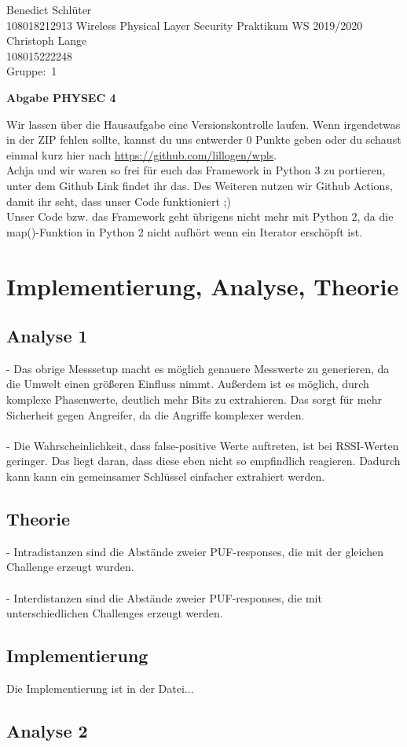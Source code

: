 \documentclass[12pt,a4paper]{article}
\newcommand{\student}{Benedict Schlüter\\ 108018212913 } %
\newcommand{\partner}{Christoph Lange\\ 108015222248} %
\newcommand{\group}{1} %
\newcommand{\hwheadtwo}{$ $
  \vspace{-2cm}
  
\noindent \student \qquad \qquad  Wireless Physical Layer Security Praktikum \hfill WS 2019/2020 \\
\noindent \partner \\
\noindent Gruppe:~\group\\
$ $

  
\begin{center}    
{\Large \bf Abgabe PHYSEC 4}
\end{center}
}
\begin{document}
\hwheadtwo
Wir lassen über die Hausaufgabe eine Versionskontrolle laufen. Wenn irgendetwas in der ZIP fehlen sollte, kannst du uns entwerder 0 Punkte geben oder du schaust einmal kurz hier nach \url{https://github.com/lillogen/wpls}.\\
Achja und wir waren so frei für euch das Framework in Python 3 zu portieren, unter dem Github Link findet ihr das. Des Weiteren nutzen wir Github Actions, damit ihr seht, dass unser Code funktioniert ;)\\
Unser Code bzw. das Framework geht übrigens nicht mehr mit Python 2, da die map()-Funktion in Python 2 nicht aufhört wenn ein Iterator erschöpft ist.
\tableofcontents
\newpage

\section{Implementierung, Analyse, Theorie}
\subsection*{Analyse 1}
- Das obrige Messsetup macht es möglich genauere Messwerte zu generieren, da die Umwelt einen größeren Einfluss nimmt. Außerdem ist es möglich, durch komplexe Phasenwerte, deutlich mehr Bits zu extrahieren. Das sorgt für mehr Sicherheit gegen Angreifer, da die Angriffe komplexer werden.\\\\
- Die Wahrscheinlichkeit, dass false-positive Werte auftreten, ist bei RSSI-Werten geringer. Das liegt daran, dass diese eben nicht so empfindlich reagieren. Dadurch kann kann ein gemeinsamer Schlüssel einfacher extrahiert werden. 
\subsection*{Theorie}
- Intradistanzen sind die Abstände zweier PUF-responses, die mit der gleichen Challenge erzeugt wurden.\\\\
- Interdistanzen sind die Abstände zweier PUF-responses, die mit unterschiedlichen Challenges erzeugt werden.
\subsection*{Implementierung}
Die Implementierung ist in der Datei...
\subsection*{Analyse 2}
\end{document}
